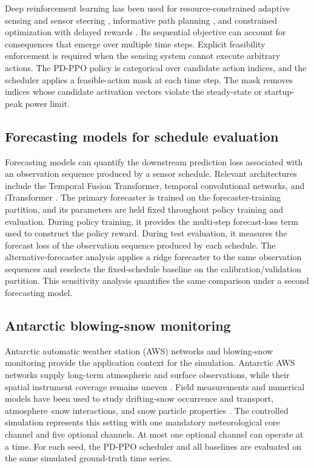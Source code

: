 Deep reinforcement learning has been used for resource-constrained adaptive
sensing and sensor steering \citep{Murad2020,Ogbodo2025}, informative path
planning \citep{Wei2020}, and constrained optimization with delayed rewards
\citep{Pendyala2024}. Its sequential objective can account for consequences that
emerge over multiple time steps. Explicit feasibility enforcement is required when
the sensing system cannot execute arbitrary actions. The PD-PPO policy is
categorical over candidate action indices, and the scheduler applies a
feasible-action mask at each time step. The mask removes indices whose candidate
activation vectors violate the steady-state or startup-peak power limit.

\subsection{Forecasting models for schedule evaluation}

Forecasting models can quantify the downstream prediction loss associated with
an observation sequence produced by a sensor schedule. Relevant architectures
include the Temporal Fusion Transformer, temporal convolutional networks, and
iTransformer \citep{Lim2021,Bai2018,Liu2024}. The primary forecaster is trained
on the forecaster-training partition, and its parameters are held fixed throughout
policy training and evaluation. During policy training, it provides the
multi-step forecast-loss term used to construct the policy reward. During test
evaluation, it measures the forecast loss of the observation sequence produced
by each schedule. The alternative-forecaster analysis applies a ridge forecaster
to the same observation sequences and reselects the fixed-schedule baseline on the
calibration/validation partition. This sensitivity analysis quantifies the same
comparison under a second forecasting model.

\subsection{Antarctic blowing-snow monitoring}

Antarctic automatic weather station (AWS) networks and blowing-snow monitoring
provide the application context for the simulation. Antarctic AWS networks supply long-term
atmospheric and surface observations, while their spatial instrument coverage
remains uneven \citep{AntAWS2023}. Field measurements and numerical models
have been used to study drifting-snow occurrence and transport,
atmosphere--snow interactions, and snow particle properties
\citep{Amory2020,Sharma2023,Monrad2026}. The controlled simulation represents
this setting with one mandatory meteorological core channel and five optional channels.
At most one optional channel can operate at a time. For each seed, the PD-PPO scheduler and all
baselines are evaluated on the same simulated ground-truth time series.
